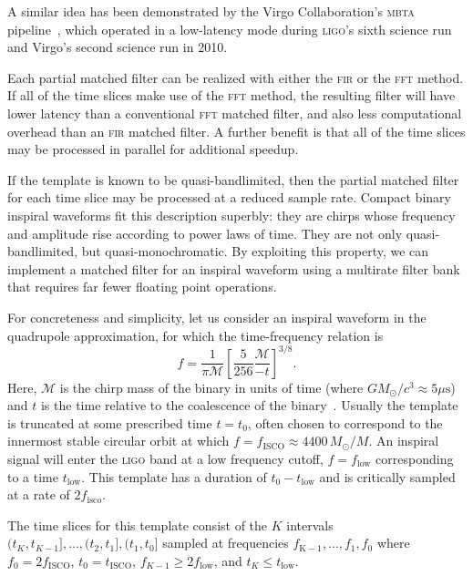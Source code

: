   A similar idea
has been demonstrated by the Virgo Collaboration's \textsc{mbta}
pipeline~\cite{Marion2004,beauville2006,beauville2008,Buskulic2010}, which
operated in a low-latency mode during \textsc{ligo}'s sixth science run and
Virgo's second science run in 2010.

Each partial matched filter can be realized with either the \textsc{fir} or the
\textsc{fft} method.  If all of the time slices make use of the \textsc{fft}
method, the resulting filter will have lower latency than a conventional
\textsc{fft} matched filter, and also less computational overhead than an
\textsc{fir} matched filter.  A further benefit is that all of the time slices
may be processed in parallel for additional speedup.

If the template is known to be quasi-bandlimited, then the partial matched
filter for each time slice may be processed at a reduced sample rate.  Compact
binary inspiral waveforms fit this description superbly: they are chirps whose
frequency and amplitude rise according to power laws of time.  They are not
only quasi-bandlimited, but quasi-monochromatic.  By exploiting this property,
we can implement a matched filter for an inspiral waveform using a multirate
filter bank that requires far fewer floating point operations.

For concreteness and simplicity, let us consider an inspiral waveform in the
quadrupole approximation, for which the time-frequency relation is
%
\begin{equation} \label{eq:fgw}
%
f = \frac{1}{\mathcal{\pi M}} \left[ \frac{5}{256}\frac{\mathcal{M}}{-t}
\right]^{3/8}.
%
\end{equation}
%
Here, $\mathcal{M}$ is the chirp mass of the binary in units of time (where $G
M_\odot / c^3 \approx 5 \mu\mathrm{s}$) and $t$ is the time relative to the
coalescence of the binary~\cite{findchirppaper, kidder1992, blanchet2002,
hanna2009}.  Usually the template is
truncated at some prescribed time $t = t_0$, often chosen to correspond to the
innermost stable circular orbit at which $f = f_\mathrm{ISCO} \approx 4400 \,
M_\odot / M$.  An inspiral signal will enter the \textsc{ligo} band at a low
frequency cutoff, $f = f_\mathrm{low}$ corresponding to a time
$t_\mathrm{low}$.  This template has a duration of $t_\mathrm{0} -
t_\mathrm{low}$ and is critically sampled at a rate of $2 f_\mathrm{isco}$.

The time slices for this template consist of the $K$ intervals $(t_K, t_{K-1}],
\dots, (t_2, t_1], (t_1, t_0]$ sampled at frequencies $f_\mathrm{K-1}, \dots,
f_1, f_0$ where $f_0 = 2 f_\mathrm{ISCO}$, $t_0 = t_\mathrm{ISCO}$, $f_{K-1}
\geqslant 2 f_\mathrm{low}$, and $t_K \leqslant t_\mathrm{low}$.

